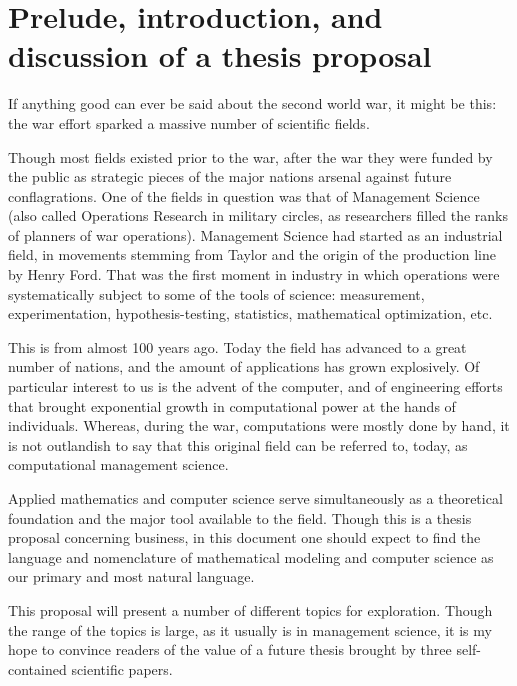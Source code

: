 \chapter*{Prelude, introduction, and discussion of a thesis proposal}
\bigskip

\noindent If anything good can ever be said about the second world war, it might be this: the war effort sparked a massive number of scientific fields.

Though most fields existed prior to the war, after the war they were funded by the public as strategic pieces of the major nations arsenal against future conflagrations. One of the fields in question was that of Management Science (also called Operations Research in military circles, as researchers filled the ranks of planners of war operations). Management Science had started as an industrial field, in movements stemming from Taylor and the origin of the production line by Henry Ford.  That was the first moment in industry in which operations were systematically subject to some of the tools of science: measurement, experimentation, hypothesis-testing, statistics, mathematical optimization, etc.

This is from almost 100 years ago. Today the field has advanced to a great number of nations, and the amount of applications has grown explosively.  Of particular interest to us is the advent of the computer, and of engineering efforts that brought exponential growth in computational power at the hands of individuals.  Whereas, during the war, computations were mostly done by hand, it is not outlandish to say that this original field can be referred to, today, as computational management science.

Applied mathematics and computer science serve simultaneously as a theoretical foundation and the major tool available to the field.  Though this is a thesis proposal concerning business, in this document one should expect to find the language and nomenclature of mathematical modeling and computer science as our primary and most natural language.  

This proposal will present a number of different topics for exploration. Though the range of the topics is large, as it usually is in management science, it is my hope to convince readers of the value of a future thesis brought by three self-contained scientific papers. %


